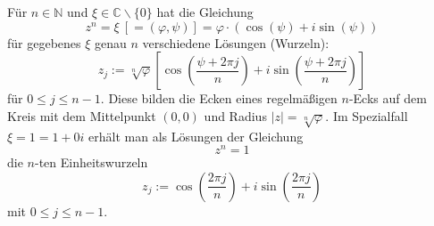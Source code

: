 Für $n \in \mathbb{N}$ und $\xi \in \mathbb{C} \backslash \{0\}$ hat die Gleichung 
$$z^n = \xi \ [= (\varphi, \psi)] = \varphi \cdot (\cos(\psi)+ i \sin(\psi))$$
für gegebenes $\xi$ genau $n$ verschiedene Lösungen (Wurzeln):
$$z_j := \sqrt[n]{\varphi} \left[ \cos \left( \frac{\psi+2\pi j}{n} \right) + i \sin \left( \frac{\psi+2\pi j}{n} \right) \right]$$
für $0 \leq j \leq n - 1$. Diese bilden die Ecken eines regelmäßigen $n$-Ecks auf dem Kreis mit dem Mittelpunkt $(0, 0)$ und Radius $|z| = \sqrt[n]{\varphi}$.
Im Spezialfall $\xi = 1 = 1+0i$ erhält man als Lösungen der Gleichung 
$$z^n = 1$$
die $n$-ten Einheitswurzeln
$$z_j := \cos \left( \frac{2\pi j}{n} \right) + i \sin \left( \frac{2\pi j}{n} \right)$$
mit $0 \leq j \leq n - 1$.